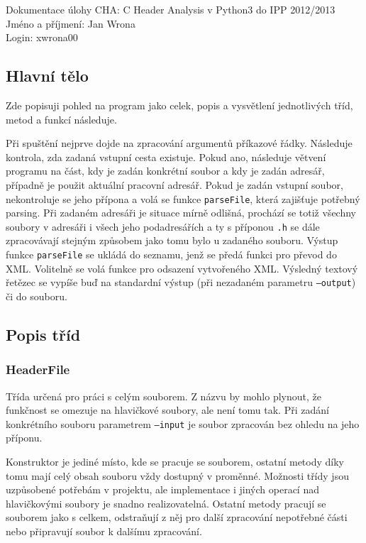 \documentclass[a4paper, 10pt]{article}[19.04.2013]
\begin{document}
\noindent
Dokumentace úlohy CHA: C Header Analysis v Python3 do IPP 2012/2013\\
Jméno a příjmení: Jan Wrona\\
Login: xwrona00

\subsection*{Hlavní tělo}
Zde popisuji pohled na program jako celek, popis a vysvětlení jednotlivých tříd, metod
a funkcí následuje.

Při spuštění nejprve dojde na zpracování argumentů příkazové řádky. Následuje kontrola,
zda zadaná vstupní cesta existuje. Pokud ano, následuje větvení programu na část, kdy
je zadán konkrétní soubor a kdy je zadán adresář, případně je použit aktuální pracovní adresář.
Pokud je zadán vstupní soubor, nekontroluje se jeho přípona a volá se funkce \texttt{parseFile},
která zajišťuje potřebný parsing. Při zadaném adresáři je situace mírně odlišná, prochází se totiž
všechny soubory v adresáři i všech jeho podadresářích a ty s příponou \texttt{.h} se dále
zpracovávají stejným způsobem jako tomu bylo u zadaného souboru. Výstup funkce \texttt{parseFile}
se ukládá do seznamu, jenž se předá funkci pro převod do XML. Volitelně se volá funkce pro
odsazení vytvořeného XML. Výsledný textový řetězec se vypíše buď na standardní výstup
(při nezadaném parametru \texttt{---output}) či do souboru.

\subsection*{Popis tříd}
\subsubsection*{{\bf HeaderFile}}
Třída určená pro práci s celým souborem. Z názvu by mohlo plynout, že funkčnost se omezuje
na hlavičkové soubory, ale není tomu tak. Při zadání konkrétního souboru parametrem
\texttt{---input} je soubor zpracován bez ohledu na jeho příponu.

Konstruktor je jediné
místo, kde se pracuje se souborem, ostatní metody díky tomu mají celý obsah souboru 
vždy dostupný v proměnné. Možnosti třídy jsou uzpůsobené potřebám v projektu, ale
implementace i jiných operací nad hlavičkovými soubory je snadno realizovatelná.
Ostatní metody pracují se souborem jako s celkem, odstraňují z něj pro další zpracování
nepotřebné části nebo připravují soubor k dalšímu zpracování.
\end{document}
